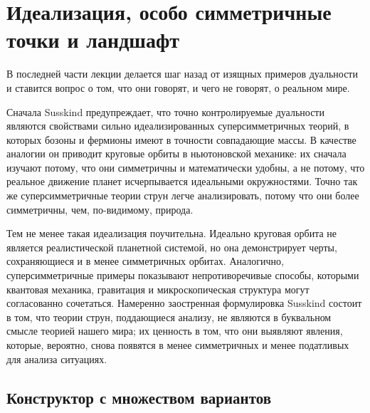 \begin{classroomqa}
\end{classroomqa}

\section{Идеализация, особо симметричные точки и ландшафт}

В последней части лекции делается шаг назад от изящных примеров дуальности и ставится вопрос о том, что они говорят, и чего не говорят, о реальном мире.

Сначала Susskind предупреждает, что точно контролируемые дуальности являются свойствами сильно идеализированных суперсимметричных теорий, в которых бозоны и фермионы имеют в точности совпадающие массы. В качестве аналогии он приводит круговые орбиты в ньютоновской механике: их сначала изучают потому, что они симметричны и математически удобны, а не потому, что реальное движение планет исчерпывается идеальными окружностями. Точно так же суперсимметричные теории струн легче анализировать, потому что они более симметричны, чем, по-видимому, природа.

Тем не менее такая идеализация поучительна. Идеально круговая орбита не является реалистической планетной системой, но она демонстрирует черты, сохраняющиеся и в менее симметричных орбитах. Аналогично, суперсимметричные примеры показывают непротиворечивые способы, которыми квантовая механика, гравитация и микроскопическая структура могут согласованно сочетаться. Намеренно заостренная формулировка Susskind состоит в том, что теории струн, поддающиеся анализу, не являются в буквальном смысле теорией нашего мира; их ценность в том, что они выявляют явления, которые, вероятно, снова появятся в менее симметричных и менее податливых для анализа ситуациях.

\subsection{Конструктор с множеством вариантов}

